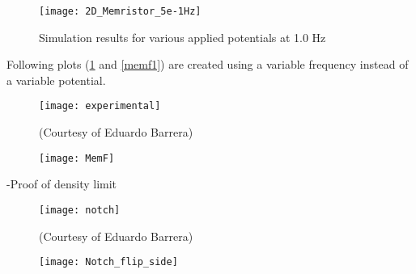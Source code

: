 \begin{doublespace}
\begin{figure}[!htp]
\centering
\texttt{[image: 2D\_Memristor\_5e-1Hz]}
\caption{Simulation results for various applied potentials at 1.0 Hz} 
\label{2D_Memristor_5e-1Hz}
\end{figure}

\clearpage
Following plots (\ref{2D_Memristor_5e-1Hz} and \ref{memf1}) are created using a variable frequency instead of a variable potential.
\begin{figure}[!htp]
\centering
\texttt{[image: experimental]}
\caption{(Courtesy of Eduardo Barrera)} 
\label{}
\end{figure}

\begin{figure}[!htp]
\centering
\texttt{[image: MemF]}
\caption{} 
\label{}
\end{figure}


\clearpage
-Proof of density limit
\begin{figure}[!htp]
\centering
\texttt{[image: notch]}
\caption{(Courtesy of Eduardo Barrera)} 
\label{}
\end{figure}

\begin{figure}[!htp]
\centering
\texttt{[image: Notch\_flip\_side]}
\caption{} 
\label{}
\end{figure}


\end{doublespace}

